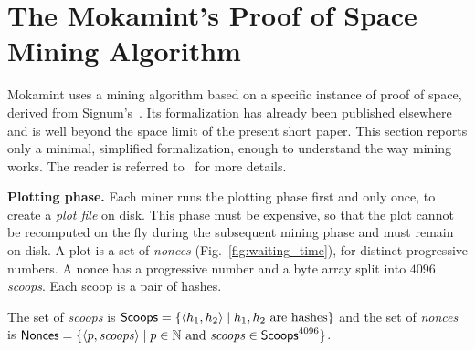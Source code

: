 \section{The Mokamint's Proof of Space Mining Algorithm}\label{sec:pos}

Mokamint uses a mining algorithm based on a specific instance of proof of space,
derived from Signum's~\cite{signum}. Its formalization has already been published elsewhere~\cite{Spoto25}
and is well beyond the space limit of the present short paper. This section
reports only a minimal, simplified formalization, enough to understand the way mining works.
The reader is referred to~\cite{Spoto25} for more details.

\vspace{0.5ex}\noindent\textbf{Plotting phase.}
%
Each miner runs the plotting phase first and only once, to create a \emph{plot file} on disk.
This phase must be expensive, so that the plot cannot be recomputed on the fly during the
subsequent mining phase and must remain on disk.
A plot is a set of \emph{nonces} (Fig.~\ref{fig:waiting_time}), for distinct progressive numbers.
A nonce has a progressive number
and a byte array split into $4096$ \emph{scoops}. Each scoop is a pair of hashes.
%
\begin{definition}\label{def:scoop_nonce}
  The set of \emph{scoops} is ${\mathsf{Scoops}}=\{\langle h_1,h_2\rangle\mid h_1,h_2\text{ are hashes}\}$
  and the set of \emph{nonces} is ${\mathsf{Nonces}}=\{\langle p,{\mathit{scoops}}\rangle\mid p\in\mathbb{N}\text{ and }{\mathit{scoops}}\in{\mathsf{Scoops}}^{4096}\}$.
\end{definition}
%
